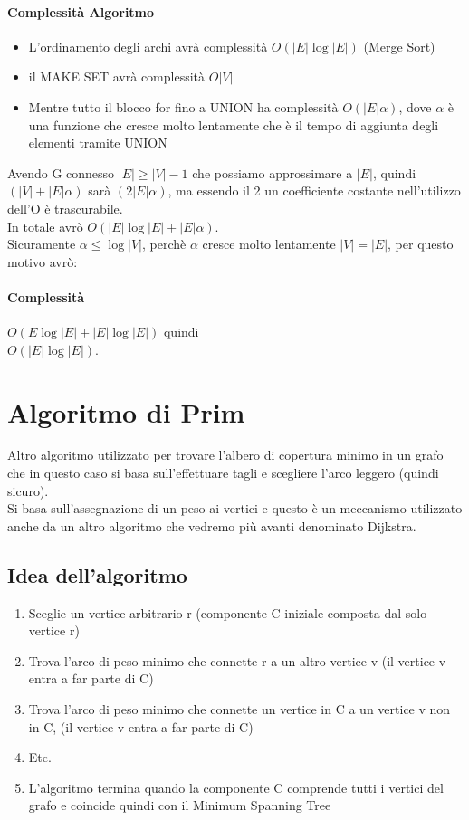 \paragraph*{Complessità Algoritmo}
\begin{itemize}
    \item L'ordinamento degli archi avrà complessità $O(|E|\log |E|)$ (Merge Sort)
    \item il MAKE SET avrà complessità $O|V|$
    \item Mentre tutto il blocco for fino a UNION ha complessità $O(|E|\alpha)$, dove
    $\alpha$ è una funzione che cresce molto lentamente che è il tempo di aggiunta degli
    elementi tramite UNION
\end{itemize}
Avendo G connesso \ra $|E| \geq |V|-1$ che possiamo approssimare a $|E|$, quindi
$(|V|+|E|\alpha)$ sarà $(2|E|\alpha)$, ma essendo il 2 un coefficiente costante nell'utilizzo
dell'O è trascurabile.\\
In totale avrò $O(|E|\log |E|+|E|\alpha)$.\\
Sicuramente $\alpha \leq \log |V|$, perchè $\alpha$ cresce molto lentamente
$|V| = |E|$, per questo motivo avrò:\\
\paragraph*{Complessità} $O(E \log|E| + |E|\log |E|)$ quindi\\
$O(|E|\log |E|)$.

\section{Algoritmo di Prim}
Altro algoritmo utilizzato per trovare l'albero di copertura minimo in un grafo che in questo
caso si basa sull'effettuare tagli e scegliere l'arco leggero (quindi sicuro).\\
Si basa sull'assegnazione di un peso ai vertici e questo è un meccanismo utilizzato anche
da un altro algoritmo che vedremo più avanti denominato Dijkstra.
\subsection{Idea dell'algoritmo}
\begin{enumerate}
    \item Sceglie un vertice arbitrario r (componente C iniziale composta dal solo
    vertice r)
    \item Trova l'arco di peso minimo che connette r a un altro vertice v
    (il vertice v entra a far parte di C)
    \item Trova l'arco di peso minimo che connette un vertice in C a un vertice
    v non in C, (il vertice v entra a far parte di C)
    \item Etc.
    \item L'algoritmo termina quando la componente C comprende tutti i vertici
    del grafo e coincide quindi con il Minimum Spanning Tree
\end{enumerate}
